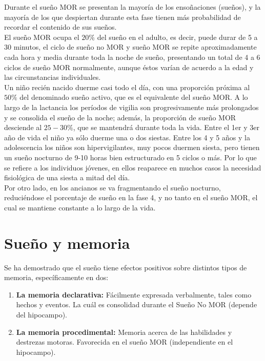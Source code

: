 \documentclass[letterpaper,titlepage,12pt,draft]{report}
\begin{document}
Durante el sue\~no MOR se presentan la mayor\'ia de los enso\~naciones (sue\~nos), y la mayor\'ia de los que despiertan durante esta fase tienen m\'as probabilidad de recordar el contenido de sus sue\~nos.\\

El sue\~no MOR ocupa el $20\%$ del sue\~no en el adulto, es decir, puede durar de 5 a 30 minutos, el ciclo de sue\~no no MOR y sue\~no MOR se repite aproximadamente cada hora y media durante toda la noche de sue\~no, presentando un total de 4 a 6 ciclos de sue\~no MOR normalmente, aunque \'estos var\'ian de acuerdo a la edad y las circunstancias individuales.\\

Un ni\~no reci\'en nacido duerme casi todo el d\'ia, con una proporci\'on pr\'oxima al $50\%$ del denominado sue\~no activo, que es el equivalente del sue\~no MOR. A lo largo de la lactancia los per\'iodos de vigilia son progresivamente m\'as prolongados y se consolida el sue\~no de la noche; adem\'as, la proporci\'on de sue\~no MOR desciende al $25-30\%$, que se mantendr\'a durante toda la vida. Entre el 1er y 3er a\~no de vida el ni\~no ya s\'olo duerme una o dos siestas. Entre los 4 y 5 a\~nos y la adolescencia los ni\~nos son hipervigilantes, muy pocos duermen siesta, pero tienen un sue\~no nocturno de 9-10 horas bien estructurado en 5 ciclos o m\'as. Por lo que se refiere a los individuos j\'ovenes, en ellos reaparece en muchos casos la necesidad fisiol\'ogica de una siesta a mitad del d\'ia\cite{Bonet}.\\

Por otro lado, en los ancianos se va fragmentando el sue\~no nocturno, reduci\'endose el porcentaje de sue\~no en la fase 4, y no tanto en el sue\~no MOR, el cual se mantiene constante a lo largo de la vida. 
 
\section{Sue\~no y memoria}

Se ha demostrado que el sue\~no tiene efectos positivos sobre distintos tipos de memoria\cite{Vas}, espec\'ificamente en dos:

\begin{enumerate}
\item {\bf {La memoria declarativa:}} F\'acilmente expresada verbalmente, tales como hechos y eventos. La cu\'al es consolidad durante el Sue\~no No MOR (depende del hipocampo). 
\item {\bf {La memoria procedimental:}} Memoria acerca de las habilidades y destrezas motoras. Favorecida en el sue\~no MOR (independiente en el hipocampo).
\end{enumerate}
\end{document}
